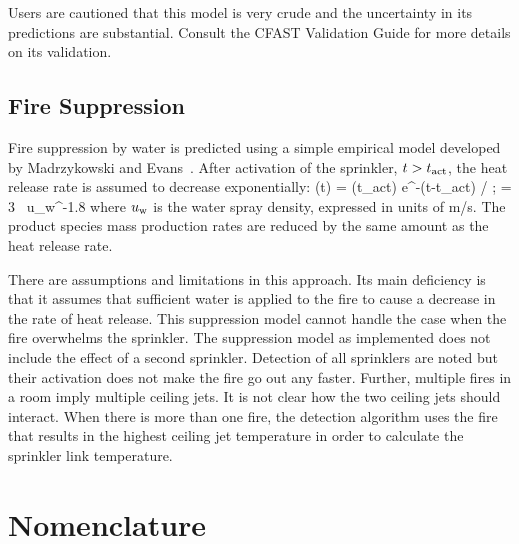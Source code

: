 \documentclass[12pt]{book}
\begin{document}
Users are cautioned that this model is very crude and the uncertainty in its predictions are substantial. Consult the CFAST Validation Guide for more details on its validation.


\section{Fire Suppression} \label{sec:suppression}

Fire suppression by water is predicted using a simple empirical model developed by Madrzykowski \cite{Madrzykowski:1992} and Evans~\cite{Evans:1993}. After activation of the sprinkler, $t > t_{\rm act}$, the heat release rate is assumed to decrease exponentially:
\be
   \dQ(t) = \dQ(t_{\rm act}) \; {\rm e}^{-(t-t_{\rm act}) /\tau}   \quad ; \quad \tau = 3 \, u_{\rm w}^{-1.8}
\ee
where $u_{\rm w}$ is the water spray density, expressed in units of m/s. The product species mass production rates are reduced by the same amount as the heat release rate.

There are assumptions and limitations in this approach. Its main deficiency is that it assumes that sufficient water is applied to the fire to cause a decrease in the rate of heat release. This suppression model cannot handle the case when the fire overwhelms the sprinkler.  The suppression model as implemented does not include the effect of a second sprinkler. Detection of all sprinklers are noted but their activation does not make the fire go out any faster. Further, multiple fires in a room imply multiple ceiling jets. It is not clear how the two ceiling jets should interact. When there is more than one fire, the detection algorithm uses the fire that results in the highest ceiling jet temperature in order to calculate the sprinkler link temperature.




\backmatter

\chapter{Nomenclature}
\end{document}
